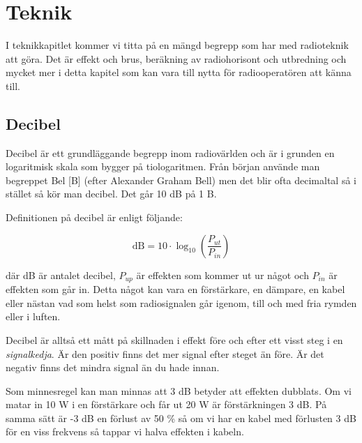 
\chapter{Teknik}

I teknikkapitlet kommer vi titta på en mängd begrepp som har med radioteknik
att göra. Det är effekt och brus, beräkning av radiohorisont och utbredning
och mycket mer i detta kapitel som kan vara till nytta för radiooperatören att
känna till.

\vfill \minitoc

\clearpage

\section{Decibel}

Decibel är ett grundläggande begrepp inom radiovärlden och är i grunden en
logaritmisk skala som bygger på tiologaritmen. Från början använde man
begreppet Bel [B] (efter Alexander Graham Bell) men det blir ofta decimaltal
så i stället så kör man decibel. Det går 10 dB på 1 B.

Definitionen på decibel är enligt följande:

\begin{equation}
  \text{dB} = 10 \cdot \log_{10} \left( \frac{P_{ut}}{P_{in}} \right)
\end{equation}

där dB är antalet decibel, $P_{up}$ är effekten som kommer ut ur något och
$P_{in}$ är effekten som går in. Detta något kan vara en förstärkare, en
dämpare, en kabel eller nästan vad som helst som radiosignalen går igenom,
till och med fria rymden eller i luften.

Decibel är alltså ett mått på skillnaden i effekt före och efter ett visst
steg i en {\it signalkedja}. Är den positiv finns det mer signal efter steget
än före. Är det negativ finns det mindra signal än du hade innan.

Som minnesregel kan man minnas att 3 dB betyder att effekten dubblats. Om vi
matar in 10 W i en förstärkare och får ut 20 W är förstärkningen 3 dB. På
samma sätt är -3 dB en förlust av 50 \% så om vi har en kabel med förlusten 3
dB för en viss frekvens så tappar vi halva effekten i kabeln.


